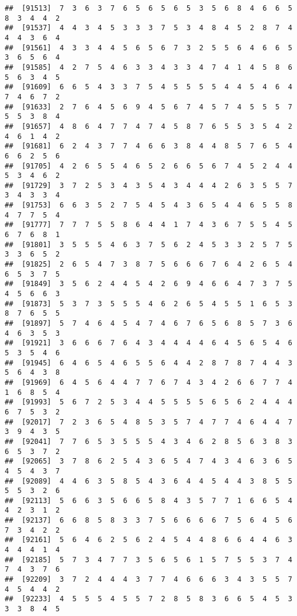\documentclass[
]{book}
\begin{document}
\begin{verbatim}
##  [91513]  7  3  6  3  7  6  5  6  5  6  5  3  5  6  8  4  6  6  5  8  3  4  4  2
##  [91537]  4  4  3  4  5  3  3  3  7  5  3  4  8  4  5  2  8  7  4  4  4  3  6  4
##  [91561]  4  3  3  4  4  5  6  5  6  7  3  2  5  5  6  4  6  6  5  3  6  5  6  4
##  [91585]  4  2  7  5  4  6  3  3  4  3  3  4  7  4  1  4  5  8  6  5  6  3  4  5
##  [91609]  6  6  5  4  3  3  7  5  4  5  5  5  5  4  4  5  4  6  4  7  4  6  7  2
##  [91633]  2  7  6  4  5  6  9  4  5  6  7  4  5  7  4  5  5  5  7  5  5  3  8  4
##  [91657]  4  8  6  4  7  7  4  7  4  5  8  7  6  5  5  3  5  4  2  4  6  1  4  2
##  [91681]  6  2  4  3  7  7  4  6  6  3  8  4  4  8  5  7  6  5  4  6  6  2  5  6
##  [91705]  4  2  6  5  5  4  6  5  2  6  6  5  6  7  4  5  2  4  4  5  3  4  6  2
##  [91729]  3  7  2  5  3  4  3  5  4  3  4  4  4  2  6  3  5  5  7  3  4  3  3  4
##  [91753]  6  6  3  5  2  7  5  4  5  4  3  6  5  4  4  6  5  5  8  4  7  7  5  4
##  [91777]  7  7  7  5  5  8  6  4  4  1  7  4  3  6  7  5  5  4  5  6  7  6  8  1
##  [91801]  3  5  5  5  4  6  3  7  5  6  2  4  5  3  3  2  5  7  5  3  3  6  5  2
##  [91825]  2  6  5  4  7  3  8  7  5  6  6  6  7  6  4  2  6  5  4  6  5  3  7  5
##  [91849]  3  5  6  2  4  4  5  4  2  6  9  4  6  6  4  7  3  7  5  4  5  6  6  3
##  [91873]  5  3  7  3  5  5  5  4  6  2  6  5  4  5  5  1  6  5  3  8  7  6  5  5
##  [91897]  5  7  4  6  4  5  4  7  4  6  7  6  5  6  8  5  7  3  6  4  6  3  5  3
##  [91921]  3  6  6  6  7  6  4  3  4  4  4  4  6  4  5  6  5  4  6  5  3  5  4  6
##  [91945]  6  4  6  5  4  6  5  5  6  4  4  2  8  7  8  7  4  4  3  5  6  4  3  8
##  [91969]  6  4  5  6  4  4  7  7  6  7  4  3  4  2  6  6  7  7  4  1  6  8  5  4
##  [91993]  5  6  7  2  5  3  4  4  5  5  5  5  6  5  6  2  4  4  4  6  7  5  3  2
##  [92017]  7  2  3  6  5  4  8  5  3  5  7  4  7  7  4  6  4  4  7  3  9  4  3  5
##  [92041]  7  7  6  5  3  5  5  5  4  3  4  6  2  8  5  6  3  8  3  6  5  3  7  2
##  [92065]  3  7  8  6  2  5  4  3  6  5  4  7  4  3  4  6  3  6  5  4  5  4  3  7
##  [92089]  4  4  6  3  5  8  5  4  3  6  4  4  5  4  4  3  8  5  5  5  5  3  2  6
##  [92113]  5  6  6  3  5  6  6  5  8  4  3  5  7  7  1  6  6  5  4  4  2  3  1  2
##  [92137]  6  6  8  5  8  3  3  7  5  6  6  6  6  7  5  6  4  5  6  7  3  4  2  2
##  [92161]  5  6  4  6  2  5  6  2  4  5  4  4  8  6  6  4  4  6  3  4  4  4  1  4
##  [92185]  5  7  3  4  7  7  3  5  6  5  6  1  5  7  5  5  3  7  4  7  4  3  7  6
##  [92209]  3  7  2  4  4  4  3  7  7  4  6  6  6  3  4  3  5  5  7  4  5  4  4  2
##  [92233]  4  5  5  5  4  5  5  7  2  8  5  8  3  6  6  5  4  5  3  3  3  8  4  5

\end{verbatim}
\end{document}
